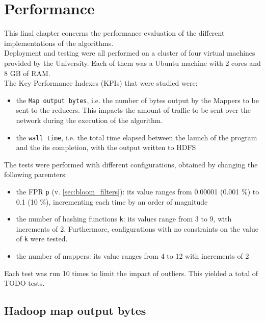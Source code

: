 %       
%
\chapter{Performance}\label{ch:performance}
This final chapter concerns the performance evaluation of the different implementations of the algorithms.\\
Deployment and testing were all performed on a cluster of four virtual machines provided by the University. Each of them was a Ubuntu machine with 2 cores and 8 GB of RAM.\\
The Key Performance Indexes (KPIs) that were studied were:
\begin{itemize}
	\item the \colorbox{gray!30}{\large \texttt{Map output bytes}}, i.e. the number of bytes output by the Mappers to be sent to the reducers. This impacts the amount of traffic to be sent over the network during the execution of the algorithm.
	\item the \colorbox{gray!30}{\large \texttt{wall time}}, i.e. the total time elapsed between the launch of the program and the its completion, with the output written to HDFS
\end{itemize}

The tests were performed with different configurations, obtained by changing the following paremters:\\
\begin{itemize}
	\item the FPR \colorbox{gray!30}{\large \texttt{p}} (v. \ref{sec:bloom_filters}): its value ranges from 0.00001 (0.001 \%) to 0.1 (10 \%), incrementing each time by an order of magnitude
	\item the number of hashing functions \colorbox{gray!30}{\large \texttt{k}}: its values range from 3 to 9, with increments of 2. Furthermore, configurations with no constraints on the value of \texttt{k} were tested.
	\item the number of mappers: its value ranges from 4 to 12 with increments of 2
\end{itemize}

Each test was run 10 times to limit the impact of outliers. This yielded a total of TODO tests.

\section{Hadoop map output bytes}

